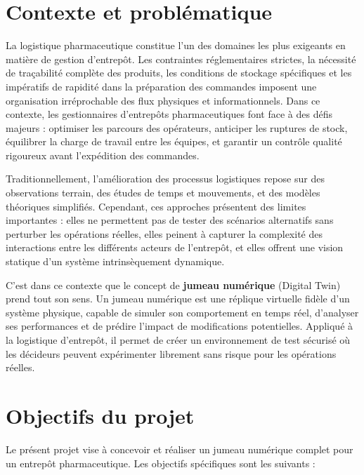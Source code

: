 \documentclass[12pt,a4paper]{report}
\begin{document}
\section{Contexte et probl\'ematique}

La logistique pharmaceutique constitue l'un des domaines les plus exigeants en mati\`ere de gestion d'entrep\^ot. Les contraintes r\'eglementaires strictes, la n\'ecessit\'e de tra\c{c}abilit\'e compl\`ete des produits, les conditions de stockage sp\'ecifiques et les imp\'eratifs de rapidit\'e dans la pr\'eparation des commandes imposent une organisation irr\'eprochable des flux physiques et informationnels. Dans ce contexte, les gestionnaires d'entrep\^ots pharmaceutiques font face \`a des d\'efis majeurs : optimiser les parcours des op\'erateurs, anticiper les ruptures de stock, \'equilibrer la charge de travail entre les \'equipes, et garantir un contr\^ole qualit\'e rigoureux avant l'exp\'edition des commandes.

Traditionnellement, l'am\'elioration des processus logistiques repose sur des observations terrain, des \'etudes de temps et mouvements, et des mod\`eles th\'eoriques simplifi\'es. Cependant, ces approches pr\'esentent des limites importantes : elles ne permettent pas de tester des sc\'enarios alternatifs sans perturber les op\'erations r\'eelles, elles peinent \`a capturer la complexit\'e des interactions entre les diff\'erents acteurs de l'entrep\^ot, et elles offrent une vision statique d'un syst\`eme intrins\`equement dynamique.

C'est dans ce contexte que le concept de \textbf{jumeau num\'erique} (Digital Twin) prend tout son sens. Un jumeau num\'erique est une r\'eplique virtuelle fid\`ele d'un syst\`eme physique, capable de simuler son comportement en temps r\'eel, d'analyser ses performances et de pr\'edire l'impact de modifications potentielles. Appliqu\'e \`a la logistique d'entrep\^ot, il permet de cr\'eer un environnement de test s\'ecuris\'e o\`u les d\'ecideurs peuvent exp\'erimenter librement sans risque pour les op\'erations r\'eelles.

\section{Objectifs du projet}

Le pr\'esent projet vise \`a concevoir et r\'ealiser un jumeau num\'erique complet pour un entrep\^ot pharmaceutique. Les objectifs sp\'ecifiques sont les suivants :
\end{document}
